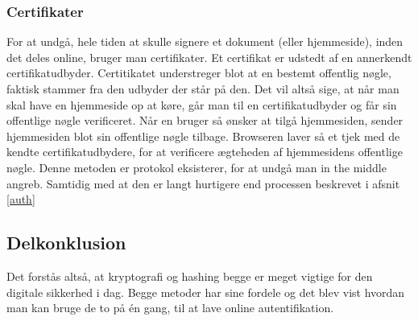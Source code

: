     \subsubsection{Certifikater}
    For at undgå, hele tiden at skulle signere et dokument (eller hjemmeside), inden det deles online, bruger man certifikater.\cite{cert}
    Et certifikat er udstedt af en annerkendt certifikatudbyder.
    Certitikatet understreger blot at en bestemt offentlig nøgle, faktisk stammer fra den udbyder der står på den.
    Det vil altså sige, at når man skal have en hjemmeside op at køre, går man til en certifikatudbyder og får sin offentlige nøgle verificeret.
    Når en bruger så ønsker at tilgå hjemmesiden, sender hjemmesiden blot sin offentlige nøgle tilbage.
    Browseren laver så et tjek med de kendte certifikatudbydere, for at verificere ægteheden af hjemmesidens offentlige nøgle.
    Denne metoden er protokol eksisterer, for at undgå man in the middle angreb.
    Samtidig med at den er langt hurtigere end processen beskrevet i afsnit \ref{auth}





\subsection{Delkonklusion}
Det forstås altså, at kryptografi og hashing begge er meget vigtige for den digitale sikkerhed i dag.
Begge metoder har sine fordele og det blev vist hvordan man kan bruge de to på én gang, til at lave online autentifikation.
